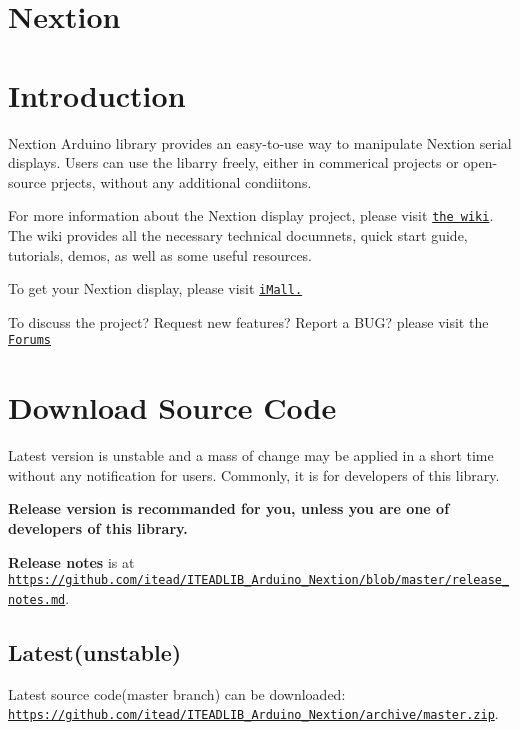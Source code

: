 \section*{Nextion}





\section*{Introduction}

Nextion Arduino library provides an easy-\/to-\/use way to manipulate Nextion serial displays. Users can use the libarry freely, either in commerical projects or open-\/source prjects, without any additional condiitons.

For more information about the Nextion display project, please visit \href{http://wiki.iteadstudio.com/Nextion_HMI_Solution}{\tt the wiki}. The wiki provides all the necessary technical documnets, quick start guide, tutorials, demos, as well as some useful resources.

To get your Nextion display, please visit \href{http://imall.itead.cc/display/nextion.html}{\tt i\+Mall.}

To discuss the project? Request new features? Report a B\+U\+G? please visit the \href{http://support.iteadstudio.com/discussions/1000058038}{\tt Forums}

\section*{Download Source Code}

Latest version is unstable and a mass of change may be applied in a short time without any notification for users. Commonly, it is for developers of this library.

{\bfseries Release version is recommanded for you, unless you are one of developers of this library.}

{\bfseries Release notes} is at \href{https://github.com/itead/ITEADLIB_Arduino_Nextion/blob/master/release_notes.md}{\tt https\+://github.\+com/itead/\+I\+T\+E\+A\+D\+L\+I\+B\+\_\+\+Arduino\+\_\+\+Nextion/blob/master/release\+\_\+notes.\+md}.

\subsection*{Latest(unstable)}

Latest source code(master branch) can be downloaded\+: \href{https://github.com/itead/ITEADLIB_Arduino_Nextion/archive/master.zip}{\tt https\+://github.\+com/itead/\+I\+T\+E\+A\+D\+L\+I\+B\+\_\+\+Arduino\+\_\+\+Nextion/archive/master.\+zip}.

